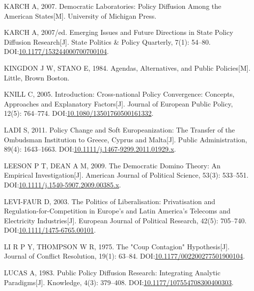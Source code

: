 \documentclass[
  12pt,
]{ctexart}
\newlength{\cslhangindent}
\newlength{\cslentryspacingunit} %
\newenvironment{CSLReferences}[2] %
 {%
  \setlength{\parindent}{0pt}
  \ifodd #1
  \let\oldpar\par
  \def\par{\hangindent=\cslhangindent\oldpar}
  \fi
  \setlength{\parskip}{#2\cslentryspacingunit}
 }%
 {}
\begin{document}
\begin{CSLReferences}{1}{0}
\leavevmode{}%
KARCH A, 2007. Democratic {Laboratories}: {Policy Diffusion Among} the {American States}{[}M{]}. {University of Michigan Press}.

\leavevmode{}%
KARCH A, 2007/ed. Emerging {Issues} and {Future Directions} in {State Policy Diffusion Research}{[}J{]}. State Politics \& Policy Quarterly, 7(1): 54--80. DOI:\href{https://doi.org/10.1177/153244000700700104}{10.1177/153244000700700104}.

\leavevmode{}%
KINGDON J W, STANO E, 1984. Agendas, Alternatives, and Public Policies{[}M{]}. {Little, Brown Boston}.

\leavevmode{}%
KNILL C, 2005. Introduction: {Cross-national} Policy Convergence: Concepts, Approaches and Explanatory Factors{[}J{]}. Journal of European Public Policy, 12(5): 764--774. DOI:\href{https://doi.org/10.1080/13501760500161332}{10.1080/13501760500161332}.

\leavevmode{}%
LADI S, 2011. Policy {Change} and {Soft Europeanization}: {The Transfer} of the {Ombudsman Institution} to {Greece}, {Cyprus} and {Malta}{[}J{]}. Public Administration, 89(4): 1643--1663. DOI:\href{https://doi.org/10.1111/j.1467-9299.2011.01929.x}{10.1111/j.1467-9299.2011.01929.x}.

\leavevmode{}%
LEESON P T, DEAN A M, 2009. The {Democratic Domino Theory}: {An Empirical Investigation}{[}J{]}. American Journal of Political Science, 53(3): 533--551. DOI:\href{https://doi.org/10.1111/j.1540-5907.2009.00385.x}{10.1111/j.1540-5907.2009.00385.x}.

\leavevmode{}%
LEVI-FAUR D, 2003. The Politics of Liberalisation: {Privatisation} and Regulation-for-Competition in {Europe}'s and {Latin America}'s Telecoms and Electricity Industries{[}J{]}. European Journal of Political Research, 42(5): 705--740. DOI:\href{https://doi.org/10.1111/1475-6765.00101}{10.1111/1475-6765.00101}.

\leavevmode{}%
LI R P Y, THOMPSON W R, 1975. The "{Coup Contagion}" {Hypothesis}{[}J{]}. Journal of Conflict Resolution, 19(1): 63--84. DOI:\href{https://doi.org/10.1177/002200277501900104}{10.1177/002200277501900104}.

\leavevmode{}%
LUCAS A, 1983. Public {Policy Diffusion Research}: {Integrating Analytic Paradigms}{[}J{]}. Knowledge, 4(3): 379--408. DOI:\href{https://doi.org/10.1177/107554708300400303}{10.1177/107554708300400303}.


\end{CSLReferences}
\end{document}
